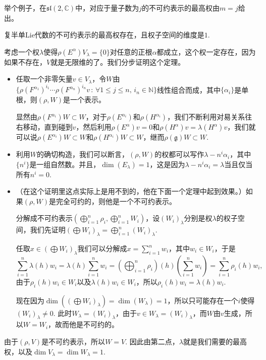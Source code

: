 \documentclass[11pt]{article}
\theoremstyle{definition}
\theoremstyle{plain}
\newcommand{\cc}{\mathbb{C}}
\newcommand{\lag}{{\mathfrak{g}}}
\begin{document}
举个例子，在$\mathfrak{sl}(2,\cc)$中，对应于量子数为$j$的不可约表示的最高权由$m=j$给出。

{\thm 复半单Lie代数的不可约表示的最高权存在，且权子空间的维度是$1$.\endthm}

\proof 考虑一个权$\lambda$使得$\rho(E^\alpha)V_\lambda=\{0\}$对任意的正根$\alpha$都成立，这个权一定存在，因为如果不存在，$V$就是无限维的了。我们分步证明这个定理。

\begin{itemize}
\item 任取一个非零矢量$v\in V_\lambda$，令$W$由$\bigl\{\rho(F^{\alpha_1})^{i_1}\cdots \rho(F^{\alpha_n})^{i_n}v\,:\, \forall 1\leq j\leq n,\, i_n\in \mathbb{N}\bigr\}$线性组合而成，其中$\{\alpha_i\}$是单根，则$(\rho,W)$是一个表示。

显然由$\rho(F^{\alpha_i})W\subset W$，对于$\rho(E^{\alpha_i})$和$\rho(H^{\alpha_i})$，我们不断利用对易关系往右移动，直到碰到$v$，然后利用$\rho(E^\alpha)v=0$和$\rho(H^\alpha)v=\lambda(H^\alpha)v$，我们就可以说$\rho(E^{\alpha_i})W\subset W$和$\rho(H^{\alpha_i})W\subset W$，继而$\rho(\lag)W\subset W$.

\item 利用$W$的确切构造，我们可以断言，$(\rho,W)$的权都可以写作$\lambda-n^i\alpha_i$，其中$\{n^i\}$是一组自然数。并且，$\dim(E_\lambda)=1$，这是因为$\lambda-n^i\alpha_i=\lambda$当且仅当所有$n^i=0$.

\item （在这个证明里这点实际上是用不到的，他在下面一个定理中起到效果。）如果$(\rho,W)$是完全可约的，则他是一个不可约表示。

分解成不可约表示$(\bigoplus_{i=1}^n\rho_i,\bigoplus_{i=1}^n W_i)$，设$(W_i)_\lambda$分别是权$\lambda$的权子空间，我们先证明$(\bigoplus W_i)_\lambda=\bigoplus_{i=1}^n (W_i)_\lambda$.

任取$x\in (\bigoplus W_i)_\lambda$我们可以分解成$x=\sum_{i=1}^nw_i$，其中$w_i\in W_i$，于是
\[
	\sum_{i=1}^n\lambda(h)w_i=\lambda(h)\sum_{i=1}^nw_i=\left(\bigoplus_{i=1}^n\rho_i\right)(h)\left(\sum_{i=1}^nw_i\right)=\sum_{i=1}^n\rho_i(h)w_i,
\]
由于$\rho_i(h)w_i\in W_i$以及$\lambda(h)w_i\in W_i$，所以$\rho_i(h)w_i=\lambda(h)w_i$. 

现在因为$\dim((\bigoplus W_i)_\lambda)=\dim(W_\lambda)=1$，所以只可能存在一个$i$使得$(W_i)_\lambda\neq 0$. 此时$W_\lambda=(W_i)_\lambda$，由于$v\in W_\lambda=(W_i)_\lambda$，而$W$由$v$生成，所以$W=W_i$，故而他是不可约的。
\end{itemize}

由于$(\rho,V)$是不可约表示，所以$W=V$. 因此由第二点，$\lambda$就是我们需要的最高权，以及$\dim V_\lambda=\dim W_\lambda=1$.\endproof 
\end{document}
